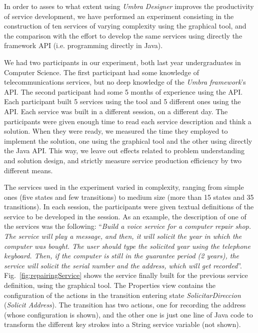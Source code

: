 In order to asses to what extent using {\em Umbra Designer} improves the productivity of service development,
we have performed an experiment consisting in the construction of ten services of varying complexity using the 
graphical tool, and the comparison with the effort to develop the same services using directly the framework API
(i.e. programming directly in Java). 

We had two participants in our experiment, both last year undergraduates in Computer Science. The first
participant had some knowledge of telecommunications services, but no deep knowledge of the {\em Umbra 
framework}'s API. The second participant had some 5 months of experience using the API. 
Each participant built 5 services using the tool and 5 different ones using the API.
Each service was built in a different session, on a different day. The participants were given enough time
to read each service description and think a solution. When they were ready, we measured the time they
employed to implement the solution, one using the graphical tool and the other using directly the Java API. 
This way, we leave out effects related to problem understanding and solution design, and strictly measure
service production efficiency by two different means.

The services used in the experiment varied in complexity, ranging from simple ones (five states
and few transitions) to medium size (more than 15 states and 35 transitions). In each session, the participants 
were given textual definitions of the service to be developed in the session. As an example, the description of one 
of the services was the following: ``{\em Build a voice service for a computer repair shop. The service will play a 
message, and then, it will solicit the year in which the computer was bought. The user should type the solicited 
year using the telephone keyboard. Then, if the computer is still in the guarantee period (2 years), the service 
will solicit the serial number and the address, which will get recorded}''. 
Fig.~\ref{fig:repairingService} shows the service finally built for the previous service definition, 
using the graphical tool. The Properties view contains the configuration of the actions in the transition
entering state {\em SolicitarDireccion} ({\em Solicit Address}). The transition has two actions, one for recording
the address (whose configuration is shown), and the other one is just one line of Java code to transform the 
different key strokes into a String service variable (not shown).

